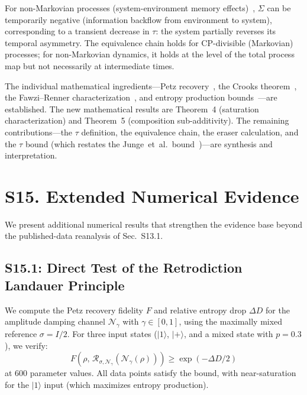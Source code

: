 \documentclass[prl,twocolumn,superscriptaddress,longbibliography]{revtex4-2}
\newcommand{\Petz}{\mathcal{R}}
\newcommand{\chan}{\mathcal{N}}
\newcommand{\ket}[1]{|#1\rangle}
\newcommand{\tauasym}{\tau}
\begin{document}
For non-Markovian processes (system-environment memory
effects)~\cite{Breuer2016}, $\Sigma$ can be temporarily negative
(information backflow from environment to system), corresponding to
a transient decrease in $\tauasym$: the system partially reverses
its temporal asymmetry.
The equivalence chain holds for CP-divisible (Markovian) processes;
for non-Markovian dynamics, it holds at the level of the total
process map but not necessarily at intermediate times.

The individual mathematical
ingredients---Petz recovery~\cite{Petz1988}, the Crooks
theorem~\cite{Crooks1999}, the Fawzi--Renner
characterization~\cite{Fawzi2015}, and entropy production
bounds~\cite{Kolchinsky2017,ReebWolf2014}---are established.
The new mathematical results are Theorem~4 (saturation
characterization) and Theorem~5 (composition sub-additivity).
The remaining contributions---the $\tauasym$ definition,
the equivalence chain, the eraser calculation, and the
$\tauasym$ bound (which restates the Junge~et~al.\
bound~\cite{Junge2018})---are synthesis and interpretation.

\section{S15. Extended Numerical Evidence}
\label{sec:extended_numerical}

We present additional numerical results that strengthen the
evidence base beyond the published-data reanalysis of Sec.~S13.1.

\subsection{S15.1: Direct Test of the Retrodiction Landauer Principle}

We compute the Petz recovery fidelity $F$ and relative entropy drop
$\Delta D$ for the amplitude damping channel $\chan_\gamma$ with
$\gamma \in [0,1]$, using the maximally mixed reference $\sigma = I/2$.
For three input states ($\ket{1}$, $\ket{+}$, and a mixed state with
$p = 0.3$), we verify:
\begin{equation}
F(\rho,\, \Petz_{\sigma,\chan_\gamma}(\chan_\gamma(\rho)))
\geq \exp(-\Delta D / 2)
\end{equation}
at 600 parameter values. All data points satisfy the bound, with
near-saturation for the $\ket{1}$ input (which maximizes entropy
production).
\end{document}
